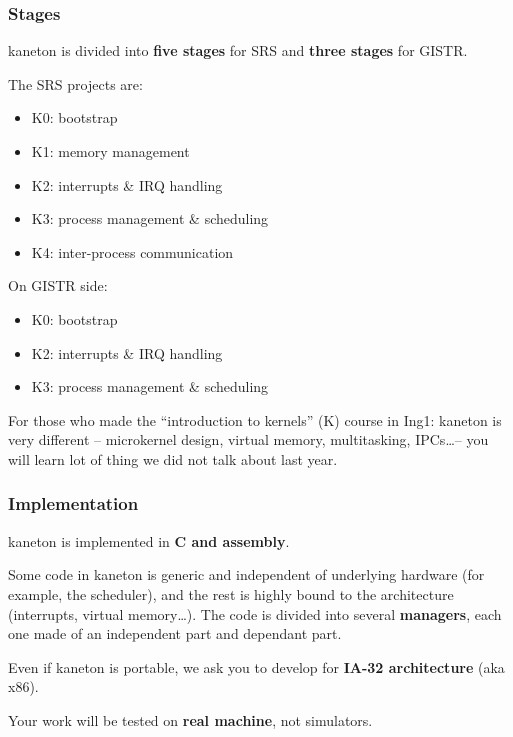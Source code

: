 \begin{frame}
  \frametitle{Stages}

  kaneton is divided into \textbf{five stages} for SRS and
  \textbf{three stages} for GISTR.

  \-

  The SRS projects are:

  \begin{itemize}
  \item
    K0: bootstrap
  \item
    K1: memory management
  \item
    K2: interrupts \& IRQ handling
  \item
    K3: process management \& scheduling
  \item
    K4: inter-process communication
  \end{itemize}

  \-

  On GISTR side:

  \begin{itemize}
  \item
    K0: bootstrap
  \item
    K2: interrupts \& IRQ handling
  \item
    K3: process management \& scheduling
  \end{itemize}

  \-

  For those who made the ``introduction to kernels'' (K) course in
  Ing1: kaneton is very different -- microkernel design, virtual
  memory, multitasking, IPCs\ldots -- you will learn lot of thing we
  did not talk about last year.

\end{frame}


\begin{frame}
  \frametitle{Implementation}

  kaneton is implemented in \textbf{C and assembly}.

  \-

  Some code in kaneton is generic and independent of underlying
  hardware (for example, the scheduler), and the rest is highly bound
  to the architecture (interrupts, virtual memory\ldots). The code is
  divided into several \textbf{managers}, each one made of an
  independent part and dependant part.

  \-

  Even if kaneton is portable, we ask you to develop for \textbf{IA-32
  architecture} (aka x86).

  \-

  Your work will be tested on \textbf{real machine}, not simulators.

\end{frame}

